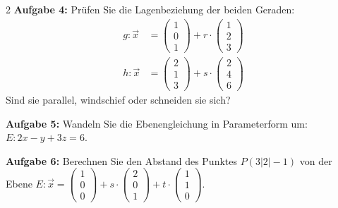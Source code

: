 \documentclass[12pt,a4paper]{article}
\newcommand{\vek}[1]{\vec{#1}}
\begin{document}
\begin{multicols}{2}
\textbf{Aufgabe 4:} Prüfen Sie die Lagenbeziehung der beiden Geraden:
\begin{align*}
g: \vek{x} &= \begin{pmatrix}1\\0\\1\end{pmatrix} + r \cdot \begin{pmatrix}1\\2\\3\end{pmatrix} \\
h: \vek{x} &= \begin{pmatrix}2\\1\\3\end{pmatrix} + s \cdot \begin{pmatrix}2\\4\\6\end{pmatrix}
\end{align*}
Sind sie parallel, windschief oder schneiden sie sich?

\vspace{3cm}

\textbf{Aufgabe 5:} Wandeln Sie die Ebenengleichung in Parameterform um: $E: 2x - y + 3z = 6$.

\vspace{3cm}

\textbf{Aufgabe 6:} Berechnen Sie den Abstand des Punktes $P(3|2|-1)$ von der Ebene $E: \vek{x} = \begin{pmatrix}1\\0\\0\end{pmatrix} + s \cdot \begin{pmatrix}2\\0\\1\end{pmatrix} + t \cdot \begin{pmatrix}1\\1\\0\end{pmatrix}$.

\vspace{3cm}


\end{multicols}
\end{document}
